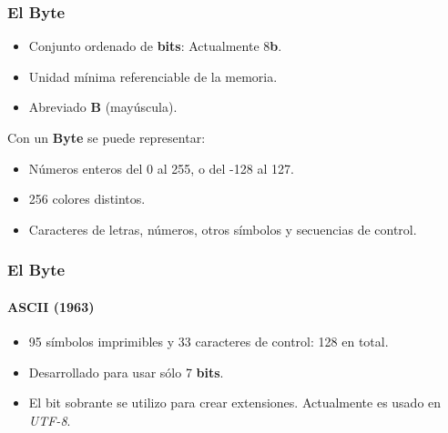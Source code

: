 \documentclass[11pt,a4paper,spanish]{beamer}
\newcommand{\bit}{\textbf{b}}
\newcommand{\Byte}{\textbf{B}}
\begin{document}
\begin{frame}

\frametitle{El \textbf{Byte}}

    \begin{itemize}
        \item Conjunto ordenado de \textbf{bits}: Actualmente 8\bit.
        \item Unidad mínima referenciable de la memoria.
        \item Abreviado \Byte{} (mayúscula).
    \end{itemize}
    \pause

    Con un \textbf{Byte} se puede representar:

    \begin{itemize}
        \item Números enteros del 0 al 255, o del -128 al 127.
        \item 256 colores distintos.
        \item Caracteres de letras, números, otros símbolos y secuencias de
            control.
    \end{itemize}

\end{frame}

\begin{frame}

\frametitle{El \textbf{Byte}}
\framesubtitle{ASCII (1963)}

\begin{itemize}
    \item 95 símbolos imprimibles y 33 caracteres de control: 128 en total.
    \item Desarrollado para usar sólo 7 \textbf{bits}.
    \item El bit sobrante se utilizo para crear extensiones. Actualmente es
        usado en \emph{UTF-8}.
\end{itemize}

\end{frame}
\end{document}
